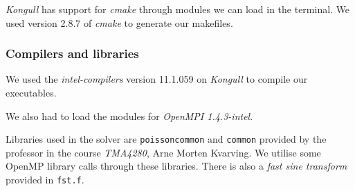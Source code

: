 \emph{Kongull} has support for \emph{cmake} through modules we can load in the terminal. We used version 2.8.7 of \emph{cmake} to generate our makefiles. 

\subsubsection{Compilers and libraries} %
\label{ssub:compilers}
We used the \emph{intel-compilers} version 11.1.059 on \emph{Kongull} to compile our executables. 

We also had to load the modules for \emph{OpenMPI 1.4.3-intel}. 

Libraries used in the solver are \texttt{poissoncommon} and \texttt{common} provided by the professor in the course \emph{TMA4280}, Arne Morten Kvarving. We utilise some OpenMP library calls through these libraries. There is also a \emph{fast sine transform} provided in \texttt{fst.f}.




